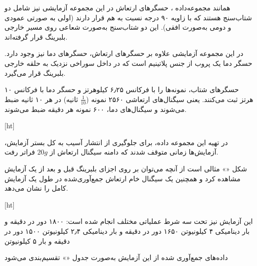 همانند مجموعه‌داده ، حسگرهای ارتعاش در این مجموعه آزمایشی نیز شامل دو شتاب‌سنج هستند که با زاویه ۹۰ درجه نسبت به هم قرار دارند (اولی به صورتی عمودی و دومی به‌صورت افقی). این دو شتاب‌سنج به‌صورت شعاعی روی مسیر خارجی بلبرینگ قرار گرفته‌اند.


در این مجموعه آزمایشی علاوه بر حسگرهای ارتعاش، حسگرهای دما نیز وجود دارد. حسگر دما یک پروب  از جنس پلاتینیم است که در داخل سوراخی نزدیک به حلقه خارجی بلبرینگ قرار می‌گیرد.


حسگرهای شتاب، نمونه‌ها را با فرکانس ۶٫۲۵ کیلوهرتز و حسگر دما با فرکانس ۱۰ هرتز ثبت می‌کنند. یعنی سیگنال‌های ارتعاشی ۲۵۶۰ نمونه ($\frac{1}{10}$ ثانیه) در هر ۱۰ ثانیه ضبط می‌شوند و سیگنال‌های دما، ۶۰۰ نمونه هر دقیقه ضبط می‌شوند.


[ht]


در تهیه این مجموعه داده، برای جلوگیری از انتشار آسیب به کل بستر آزمایش، آزمایش‌ها زمانی متوقف شدند که دامنه سیگنال ارتعاش از $20g$ فراتر رفت.


شکل «» مثالی است از آنچه می‌توان بر روی اجزای بلبرینگ قبل و بعد از یک آزمایش مشاهده کرد و همچنین یک سیگنال خام ارتعاش جمع‌آوری‌شده در طول یک آزمایش کامل را نشان می‌دهد.


[ht]






این آزمایش نیز تحت سه شرط عملیاتی مختلف انجام شده است:
 ۱۸۰۰ دور در دقیقه و بار دینامیکی ۴ کیلونیوتن
 ۱۶۵۰ دور در دقیقه و بار دینامیکی ۲٫۴ کیلونیوتن
 ۱۵۰۰ دور در دقیقه و بار ۵ کیلونیوتن


داده‌های جمع‌آوری شده از این آزمایش به‌صورت جدول «» تقسیم‌بندی می‌شود

